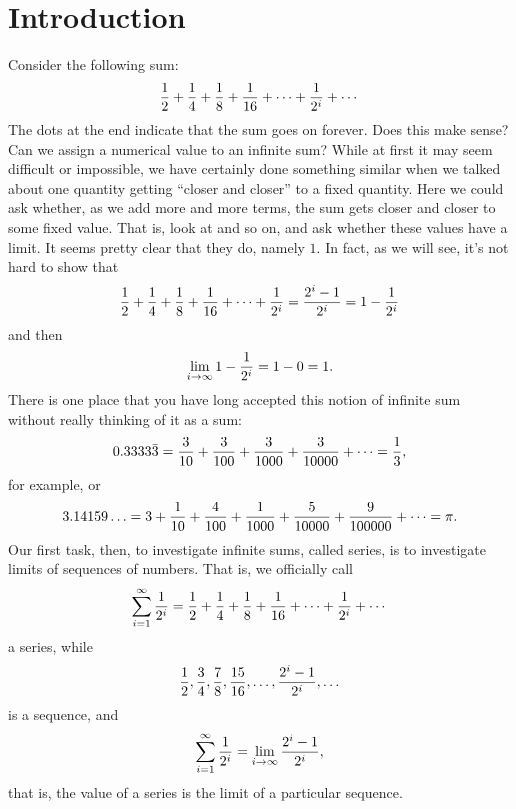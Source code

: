 \chapter*{Introduction}

Consider the following sum:
$${1\over2}+{1\over4}+{1\over8}+{1\over16}+\cdots+{1\over2^i}+\cdots$$
The dots at the end indicate that the sum goes on forever. Does this
make sense? Can we assign a numerical value to an infinite sum? While
at first it may seem difficult or impossible, we have certainly done
something similar when we talked about one quantity getting ``closer
and closer'' to a fixed quantity. Here we could ask whether, as we add
more and more terms, the sum gets closer and closer to some fixed
value. That is, look at
and so on, and ask whether these values have a limit. It seems pretty
clear that they do, namely $1$. In fact, as we will see, it's not hard
to show that 
$${1\over2}+{1\over4}+{1\over8}+{1\over16}+\cdots+{1\over2^i}=
{2^i-1\over2^i}=1-{1\over2^i}$$
and then
$$\lim_{i\to\infty} 1-{1\over2^i}=1-0=1.$$
There is one place that you have long accepted this notion of infinite
sum without really thinking of it as a sum:
$$0.3333\bar3 =
{3\over10}+{3\over100}+{3\over1000}+{3\over10000}+\cdots=
{1\over3},$$
for example, or
$$3.14159\ldots = 3+{1\over10}+{4\over100}+{1\over1000}+{5\over10000}+
{9\over100000}+\cdots = \pi.$$
Our first task, then,  to investigate infinite sums, called 
{\dfont series\/}, is to investigate limits of {\dfont
  sequences\/} of numbers. That is, we officially
call
$$\sum_{i=1}^\infty {1\over2^i}=
{1\over2}+{1\over4}+{1\over8}+{1\over16}+\cdots+{1\over2^i}+\cdots$$
a series, while
$${1\over2},{3\over4},{7\over8},{15\over16},\ldots,{2^i-1\over2^i},\ldots$$
is a sequence, and
$$\sum_{i=1}^\infty {1\over2^i}=\lim_{i\to\infty} {2^i-1\over2^i},$$
that is, the value of a series is the limit of a particular sequence.


